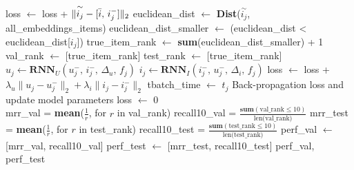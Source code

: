 \begin{algorithm}[H]
\begin{algorithmic}
            \STATE loss $\leftarrow$ loss + $\| \overset{\sim}{i_j} - [ \Bar{i}, \, i_j^-] \|_2$
            \STATE euclidean\_dist $\leftarrow$ \textbf{Dist}($\overset{\sim}{i_j}$, all\_embeddings\_items)
            \STATE euclidean\_dist\_smaller $\leftarrow$ (euclidean\_dist < euclidean\_dist[$i_j$])
            \STATE true\_item\_rank $\leftarrow$ \textbf{sum}(euclidean\_dist\_smaller) + 1
                \STATE val\_rank $\leftarrow$ [true\_item\_rank]
            \ELSE
                \STATE test\_rank $\leftarrow$ [true\_item\_rank]
            \ENDIF
            \STATE $u_j \leftarrow \textbf{RNN}_U(u_j^-,\,i_j^-,\,\Delta_u,\,f_j)$
            \STATE $i_j \leftarrow \textbf{RNN}_I(i_j^-,\,u_j^-,\,\Delta_i,\,f_j)$
            \STATE loss $\leftarrow$ loss + $\lambda_u \| u_j - u_j^- \|_2 + \lambda_i \| i_j - i_j^- \|_2$
                \STATE tbatch\_time $\leftarrow$ $t_j$
                \STATE Back-propagation loss and update model parameters
                \STATE loss $\leftarrow$ 0
            \ENDIF
        \ENDFOR\\
        \STATE mrr\_val = \textbf{mean}($\frac{1}{r}$, for $r$ in val\_rank)
        \STATE recall10\_val = $\frac{\textbf{sum}(\text{val\_rank} \leq 10)}{\text{len(val\_rank)}}$
        \STATE mrr\_test = \textbf{mean}($\frac{1}{r}$, for $r$ in test\_rank)
        \STATE recall10\_test = $\frac{\textbf{sum}(\text{test\_rank} \leq 10)}{\text{len(test\_rank)}}$
        \STATE perf\_val $\leftarrow$ [mrr\_val, recall10\_val]
        \STATE perf\_test $\leftarrow$ [mrr\_test, recall10\_test]
        \RETURN perf\_val, perf\_test
    \end{algorithmic}
\end{algorithm}



